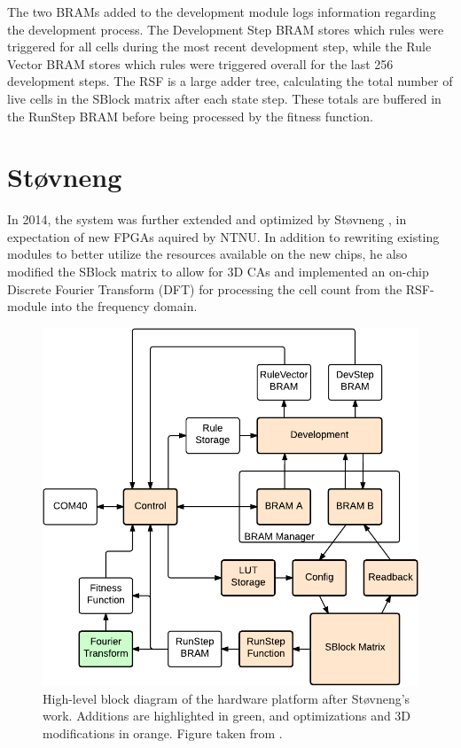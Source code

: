The two BRAMs added to the development module logs information regarding the
development process. The Development Step BRAM stores which rules were triggered
for all cells during the most recent development step, while the Rule Vector
BRAM stores which rules were triggered overall for the last 256 development
steps. The RSF is a large adder tree, calculating the total number of live cells
in the SBlock matrix after each state step. These totals are buffered in the
RunStep BRAM before being processed by the fitness function.

\section{Støvneng}

In 2014, the system was further extended and optimized by Støvneng
\cite{Stovneng2014}, in expectation of new FPGAs aquired by NTNU. In addition to
rewriting existing modules to better utilize the resources available on the new
chips, he also modified the SBlock matrix to allow for 3D CAs and implemented an
on-chip Discrete Fourier Transform (DFT) for processing the cell count from the
RSF-module into the frequency domain.

\begin{figure}[!ht]
    \centering
    \includegraphics[width=0.8\linewidth]{fig/overview-stovneng}
    \caption[Støvneng's hardware design]{
        High-level block diagram of the hardware platform after Støvneng's work.
        Additions are highlighted in green, and optimizations and 3D modifications in orange.
        Figure taken from \cite{Lundal2015a}.
    }
    \label{fig:overview-stovneng}
\end{figure}

